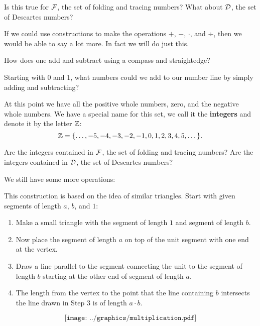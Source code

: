 \begin{question}
Is this true for $\mathcal F$, the set of folding and tracing numbers? What about
$\mathcal D$, the set of Descartes numbers?
\end{question}
\QM

If we could use constructions to make the operations $+$, $-$, $\cdot$, and $\div$, then we would be able to say a lot more.  In fact we will  do just this. 

\begin{question} 
How does one add and subtract using a compass and straightedge?
\end{question} 
\QM

\begin{question} 
Starting with $0$ and $1$, what numbers could we add to our number
line by simply adding and subtracting?
\end{question}

At this point we have all the positive whole numbers, zero, and the
negative whole numbers. We have a special name for this set, we call
it the \textbf{integers} and denote it by the letter
$\mathbb Z$:
\[
\Z = \{\dots, -5, -4, -3, -2, -1, 0, 1,2,3,4,5,\dots \}. \index{Z@$\Z$}
\]
\begin{question}
Are the integers contained in $\mathcal F$, the set of folding and tracing numbers? Are
the integers contained in $\mathcal D$, the set of Descartes numbers?
\end{question}
\QM

We still have some more operations:

\begin{construction}[Multiplication] 
This construction is based on the idea of similar triangles. Start
with given segments of length $a$, $b$, and $1$:
\begin{enumerate}
 \item Make a small triangle with the segment  of length $1$ and segment of length $b$.
 \item Now place the segment of length $a$ on top of the unit segment  with one end at the vertex.
 \item Draw a line parallel to the segment connecting the unit to the segment of length $b$ starting at the other end of segment of length $a$.
 \item The length from the vertex to the point that the line containing $b$ intersects the line drawn in Step $3$ is of length $a\cdot b$.
\end{enumerate}
\[
\texttt{[image: ../graphics/multiplication.pdf]}
\]
\end{construction}

